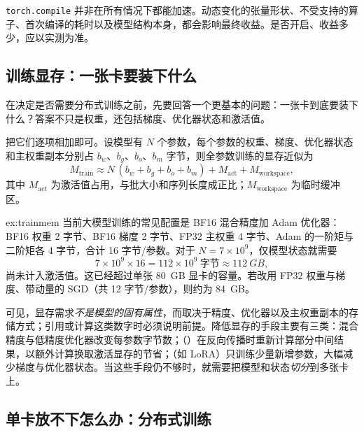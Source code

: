 \begin{pitfall}
\texttt{torch.compile} 并非在所有情况下都能加速。动态变化的张量形状、不受支持的算子、首次编译的耗时以及模型结构本身，都会影响最终收益。是否开启、收益多少，应以实测为准。
\end{pitfall}

\subsection{训练显存：一张卡要装下什么}
\label{subsec:train-mem}

在决定是否需要分布式训练之前，先要回答一个更基本的问题：一张卡到底要装下什么？答案不只是权重，还包括梯度、优化器状态和激活值。

把它们逐项相加即可。设模型有 $N$ 个参数，每个参数的权重、梯度、优化器状态和主权重副本分别占 $b_w$、$b_g$、$b_o$、$b_m$ 字节，则全参数训练的显存近似为
\begin{equation}
  M_{\mathrm{train}} \approx N\,(b_w+b_g+b_o+b_m) + M_{\mathrm{act}} + M_{\mathrm{workspace}},
  \label{eq:train-mem}
\end{equation}
其中 $M_{\mathrm{act}}$ 为激活值占用，与批大小和序列长度成正比；$M_{\mathrm{workspace}}$ 为临时缓冲区。

\begin{example}[7B 模型的训练显存]{ex:trainmem}
当前大模型训练的常见配置是 BF16 混合精度加 Adam 优化器\cite{rajbhandari2020zero}：BF16 权重 2 字节、BF16 梯度 2 字节、FP32 主权重 4 字节、Adam 的一阶矩与二阶矩各 4 字节，合计 16 字节/参数。对于 $N=7\times10^9$，仅模型状态就需要
\[
  7\times10^{9}\times16 = 112\times10^{9}\ \text{字节} \approx \SI{112}{GB},
\]
尚未计入激活值。这已经超过单张 \SI{80}{GB} 显卡的容量。若改用 FP32 权重与梯度、带动量的 SGD（共 12 字节/参数），则约为 \SI{84}{GB}。
\end{example}

可见，显存需求\emph{不是模型的固有属性}，而取决于精度、优化器以及主权重副本的存储方式；引用或计算这类数字时必须说明前提。降低显存的手段主要有三类：混合精度与低精度优化器改变每参数字节数；（）在反向传播时重新计算部分中间结果，以额外计算换取激活显存的节省；（如 LoRA\cite{hu2021lora}）只训练少量新增参数，大幅减少梯度与优化器状态。当这些手段仍不够时，就需要把模型和状态\emph{切分}到多张卡上。

\subsection{单卡放不下怎么办：分布式训练}
\label{subsec:parallel}

